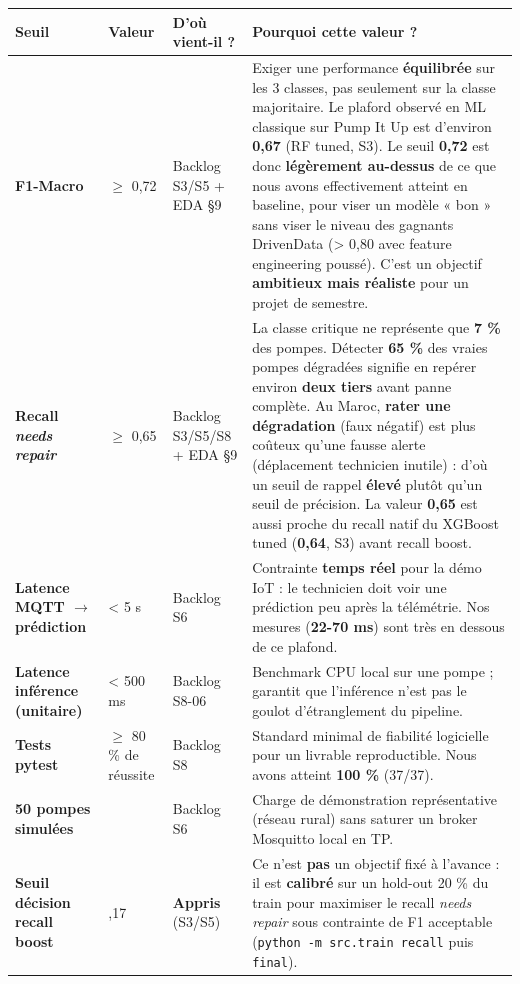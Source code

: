 \documentclass[11pt,a4paper]{report}
\begin{document}
{\small
\begin{longtable}{@{}>{\raggedright\arraybackslash}p{}>{\raggedright\arraybackslash}p{}>{\raggedright\arraybackslash}p{}>{\raggedright\arraybackslash}p{}@{}}
\toprule
\rowcolor{EHTPTableHead}Seuil & Valeur & D'où vient-il ? & Pourquoi cette valeur ? \\
\midrule
\textbf{F1-Macro} & $\geq$ 0,72 & Backlog S3/S5 + EDA §9 & Exiger une performance \textbf{équilibrée} sur les 3 classes, pas seulement sur la classe majoritaire. Le plaford observé en ML classique sur Pump It Up est d'environ \textbf{0,67} (RF tuned, S3). Le seuil \textbf{0,72} est donc \textbf{légèrement au-dessus} de ce que nous avons effectivement atteint en baseline, pour viser un modèle « bon » sans viser le niveau des gagnants DrivenData (> 0,80 avec feature engineering poussé). C'est un objectif \textbf{ambitieux mais réaliste} pour un projet de semestre. \\
\textbf{Recall \textit{needs repair}} & $\geq$ 0,65 & Backlog S3/S5/S8 + EDA §9 & La classe critique ne représente que \textbf{7 \%} des pompes. Détecter \textbf{65 \%} des vraies pompes dégradées signifie en repérer environ \textbf{deux tiers} avant panne complète. Au Maroc, \textbf{rater une dégradation} (faux négatif) est plus coûteux qu'une fausse alerte (déplacement technicien inutile) : d'où un seuil de rappel \textbf{élevé} plutôt qu'un seuil de précision. La valeur \textbf{0,65} est aussi proche du recall natif du XGBoost tuned (\textbf{0,64}, S3) avant recall boost. \\
\textbf{Latence MQTT $\rightarrow$ prédiction} & < 5 s & Backlog S6 & Contrainte \textbf{temps réel} pour la démo IoT : le technicien doit voir une prédiction peu après la télémétrie. Nos mesures (\textbf{22-70 ms}) sont très en dessous de ce plafond. \\
\textbf{Latence inférence (unitaire)} & < 500 ms & Backlog S8-06 & Benchmark CPU local sur une pompe ; garantit que l'inférence n'est pas le goulot d'étranglement du pipeline. \\
\textbf{Tests pytest} & $\geq$ 80 \% de réussite & Backlog S8 & Standard minimal de fiabilité logicielle pour un livrable reproductible. Nous avons atteint \textbf{100 \%} (37/37). \\
\textbf{50 pompes simulées} & 50 & Backlog S6 & Charge de démonstration représentative (réseau rural) sans saturer un broker Mosquitto local en TP. \\
\textbf{Seuil décision recall boost} & 0,17 & \textbf{Appris} (S3/S5) & Ce n'est \textbf{pas} un objectif fixé à l'avance : il est \textbf{calibré} sur un hold-out 20 \% du train pour maximiser le recall \textit{needs repair} sous contrainte de F1 acceptable (\texttt{python -m src.train recall} puis \texttt{final}). \\
\bottomrule
\end{longtable}
}
\end{document}
